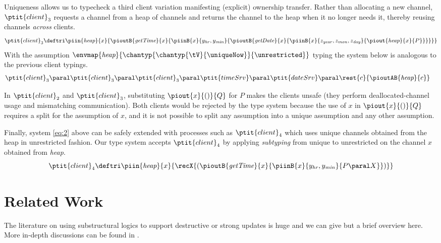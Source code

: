 \documentclass[copyright]{eptcs}
\begin{document}
Uniqueness allows us to typecheck a third client variation manifesting (explicit)
ownership transfer. Rather than allocating a new channel, $\ptit{client}_3$
requests a channel from a heap of channels and returns the channel to the heap
when it no longer needs it, thereby reusing channels \emph{across} clients.
\begin{equation*}
\ptit{client}_3 \deftri \piin{\textit{heap}}{x}{\pioutB{\textit{getTime}}{x}{\piinB{x}{y_\mathit{hr}, y_\mathit{min}}{\pioutB{\textit{getDate}}{x}{\piinB{x}{z_\mathit{year}, z_\mathit{mon}, z_\mathit{day}}{\piout{\textit{heap}}{x}{P}}}}}}
\end{equation*}
With the assumption
$\envmap{\textit{heap}}{\chantyp{\chantyp{\tV}{\uniqueNow}}{\unrestricted}}$
typing the system below is analogous to the previous client typings.
\begin{align}\label{eq:2}
   &\ptit{client}_3 \paral \ptit{client}_3 \paral \ptit{client}_3 \paral \ptit{timeSrv} \paral \ptit{dateSrv} \paral \rest{c}{\pioutAB{\textit{heap}}{c}} 
\end{align}

In $\ptit{client}_2$ and $\ptit{client}_3$, substituting $\piout{x}{()}{Q}$ for
$P$  makes the clients unsafe (they perform \resp  deallocated-channel usage
and mismatching communication).  Both clients would be rejected by the type
system because the use of  $x$ in $\piout{x}{()}{Q}$ requires a split for the
assumption of $x$, and it is not possible to split any assumption into a unique
assumption and any other assumption.

Finally, system \eqref{eq:2} above can be safely extended with processes such as
$\ptit{client}_4$ which uses unique channels obtained from the heap in
unrestricted fashion.  Our type system accepts $\ptit{client}_4$ by applying
\emph{subtyping} from unique to unrestricted on the channel $x$ obtained from
\textit{heap}.   
\begin{equation*}
\ptit{client}_4 \deftri \piin{\textit{heap}}{x}{\recX{(\pioutB{\textit{getTime}}{x}{\piinB{x}{y_\mathit{hr}, y_\mathit{min}}{P \paral X}})}}
\end{equation*}

\section{Related Work}
\label{sec:RelatedWork}

The literature on using substructural logics to support destructive or strong
updates is huge and we can give but a brief overview here. More in-depth
discussions can be found in \cite{edsko:thesis,pottier:2007}.
\end{document}
